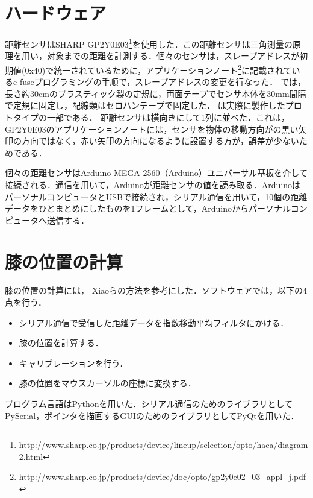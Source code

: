 \section{ハードウェア}
距離センサはSHARP GP2Y0E03\footnote{http://www.sharp.co.jp/products/device/lineup/selection/opto/haca/diagram2.html}を使用した．この距離センサは三角測量の原理を用い，対象までの距離を計測する．個々のセンサは，スレーブアドレスが初期値(0x40)で統一されているために，アプリケーションノート\footnote{http://www.sharp.co.jp/products/device/doc/opto/gp2y0e02\_03\_appl\_j.pdf}に記載されているe-fuseプログラミングの手順で，スレーブアドレスの変更を行なった．
\SysName では，長さ約30\si{cm}のプラスティック製の定規に，両面テープでセンサ本体を30\si{mm}間隔で定規に固定し，配線類はセロハンテープで固定した．
は実際に製作したプロトタイプの一部である．
距離センサは横向きにして1列に並べた．これは，GP2Y0E03のアプリケーションノート\footnotemark[2]には，センサを物体の移動方向がの黒い矢印の方向ではなく，赤い矢印の方向になるように設置する方が，誤差が少ないためである．
\par
個々の距離センサはArduino MEGA 2560（Arduino）ユニバーサル基板を介して接続される．\iic 通信を用いて，Arduinoが距離センサの値を読み取る．ArduinoはパーソナルコンピュータとUSBで接続され，シリアル通信を用いて，10個の距離データをひとまとめにしたものを1フレームとして，Arduinoからパーソナルコンピュータへ送信する．
\section{膝の位置の計算} 
膝の位置の計算には，
Xiaoら\cite{Xiao:2018:LOP:3173574.3173669}の方法を参考にした．ソフトウェアでは，以下の4点を行う．
\begin{itemize}
	\item シリアル通信で受信した距離データを指数移動平均フィルタにかける．
	\item 膝の位置を計算する．
	\item キャリブレーションを行う．
	\item 膝の位置をマウスカーソルの座標に変換する．
\end{itemize}
プログラム言語はPythonを用いた．シリアル通信のためのライブラリとしてPySerial，ポインタを描画するGUIのためのライブラリとしてPyQtを用いた．
